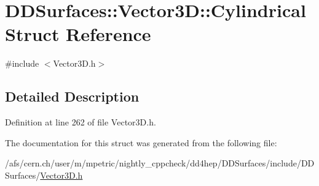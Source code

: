 \hypertarget{struct_d_d_surfaces_1_1_vector3_d_1_1_cylindrical}{
\section{DDSurfaces::Vector3D::Cylindrical Struct Reference}
\label{struct_d_d_surfaces_1_1_vector3_d_1_1_cylindrical}
}


{\ttfamily \#include $<$Vector3D.h$>$}

\subsection{Detailed Description}


Definition at line 262 of file Vector3D.h.

The documentation for this struct was generated from the following file:\begin{DoxyCompactItemize}
\item 
/afs/cern.ch/user/m/mpetric/nightly\_\-cppcheck/dd4hep/DDSurfaces/include/DDSurfaces/\hyperlink{_vector3_d_8h}{Vector3D.h}\end{DoxyCompactItemize}
